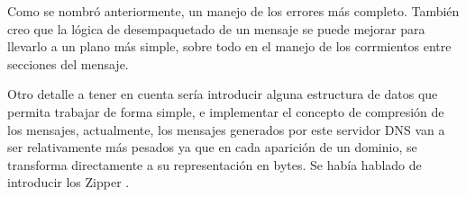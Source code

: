\documentclass[6pt]{article}
\begin{document}
Como se nombró anteriormente, un manejo de los errores más completo.
También creo que la lógica de desempaquetado de un mensaje se puede
mejorar para llevarlo a un plano más simple, sobre todo en el manejo
de los corrmientos entre secciones del mensaje.

Otro detalle a tener en cuenta sería introducir alguna estructura de
datos que permita trabajar de forma simple, e implementar el concepto
de compresión de los mensajes, actualmente, los mensajes generados
por este servidor DNS van a ser relativamente más pesados ya que en
cada aparición de un dominio, se transforma directamente a su
representación en bytes. Se había hablado de introducir los
Zipper \cite{package-zipper}.

\clearpage
\renewcommand\refname{Referencias}


\end{document}
